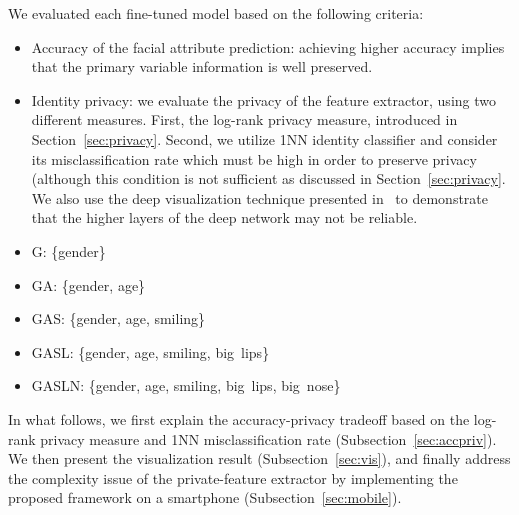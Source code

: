 \documentclass[10pt,journal,compsoc]{IEEEtran}
\newcommand{\alert}[1]{\textcolor{purple}{#1}}
\begin{document}
We evaluated each fine-tuned model based on the following criteria:
\begin{itemize}
\item Accuracy of the facial attribute prediction: achieving higher accuracy implies that the primary variable information is well preserved.
\item Identity privacy: we evaluate the privacy of the feature extractor, using two different measures. First, the log-rank privacy measure, introduced in Section~\ref{sec:privacy}. Second, we utilize 1NN identity classifier and consider its misclassification rate which must be high in order to preserve privacy (although this condition is not sufficient as discussed in Section~\ref{sec:privacy}. We also use the deep visualization technique presented in~\cite{dosovitskiy2016} to demonstrate that the higher layers of the deep network may not be reliable.
\end{itemize}%
\begin{itemize}
	\item G: \{gender\}
	\item GA: \{gender, age\}
	\item GAS: \{gender, age, smiling\}
	\item GASL: \{gender, age, smiling, big~lips\}
	\item GASLN: \{gender, age, smiling, big~lips, big~nose\}
\end{itemize}In what follows, we first explain the accuracy-privacy tradeoff based on the log-rank privacy measure and 1NN misclassification rate (Subsection~\ref{sec:accpriv}). We then present the visualization result (Subsection~\ref{sec:vis}), and finally address the complexity issue of the private-feature extractor by implementing the proposed framework on a smartphone (Subsection~\ref{sec:mobile}). 
\end{document}
